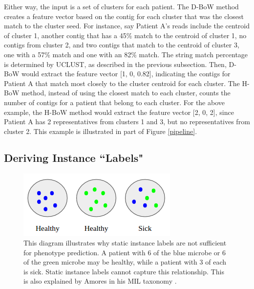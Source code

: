Either way, the input is a set of clusters for each patient. The D-BoW method creates a feature vector based on the contig for each cluster that was the closest match to the cluster seed. For instance, say Patient A's reads include the centroid of cluster 1, another contig that has a 45\% match to the centroid of cluster 1, no contigs from cluster 2, and two contigs that match to the centroid of cluster 3, one with a 57\% match and one with an 82\% match. The string match percentage is determined by UCLUST, as described in the previous subsection. Then, D-BoW would extract the feature vector [1, 0, 0.82], indicating the contigs for Patient A that match most closely to the cluster centroid for each cluster. The H-BoW method, instead of using the closest match to each cluster, counts the number of contigs for a patient that belong to each cluster. For the above example, the H-BoW method would extract the feature vector [2, 0, 2], since Patient A has 2 representatives from clusters 1 and 3, but no representatives from cluster 2. This example is illustrated in part of Figure \ref{pipeline}.

\subsection{Deriving Instance ``Labels"}
\label{deriving-instances}

\begin{figure}[t]
\centering
\includegraphics[scale=0.5]{./instance-labels.png}
\caption{This diagram illustrates why static instance labels are not sufficient for phenotype prediction. A patient with 6 of the blue microbe or 6 of the green microbe may be healthy, while a patient with 3 of each is sick. Static instance labels cannot capture this relationship. This is also explained by Amores in his MIL taxonomy \cite{amores13}.} \label{instance-labels}
\end{figure}

